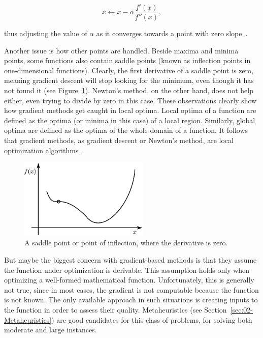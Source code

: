 \begin{equation}
x\leftarrow x-\alpha\frac{f'(x)}{f''(x)},
\end{equation}


\noindent thus adjusting the value of $\alpha$ as it converges towards
a point with zero slope~\cite{Luke-Essentials_of_metaheuristics:2009}.

Another issue is how other points are handled. Beside maxima and minima
points, some functions also contain saddle points (known as inflection
points in one-dimensional functions). Clearly, the first derivative
of a saddle point is zero, meaning gradient descent will stop looking
for the minimum, even though it has not found it (see Figure~\ref{fig:02-gradient_descent_saddle_point}).
Newton's method, on the other hand, does not help either, even trying
to divide by zero in this case. These observations clearly show how
gradient methods get caught in local optima. Local optima of a function
are defined as the optima (or minima in this case) of a local region.
Similarly, global optima are defined as the optima of the whole domain
of a function. It follows that gradient methods, as gradient descent
or Newton\textquoteright{}s method, are local optimization algorithms~\cite{Luke-Essentials_of_metaheuristics:2009}.

\begin{figure}
\centering

\includegraphics[width=0.55\textwidth]{02-background_and_motivation/img/gradient_descent_saddle_point}

\caption{A saddle point or point of inflection, where the derivative is zero.
\label{fig:02-gradient_descent_saddle_point}}
\end{figure}


But maybe the biggest concern with gradient-based methods is that
they assume the function under optimization is derivable. This assumption
holds only when optimizing a well-formed mathematical function. Unfortunately,
this is generally not true, since in most cases, the gradient is not
computable because the function is not known. The only available approach
in such situations is creating inputs to the function in order to
assess their quality. Metaheuristics (see Section~\ref{sec:02-Metaheuristics})
are good candidates for this class of problems, for solving both moderate
and large instances.


